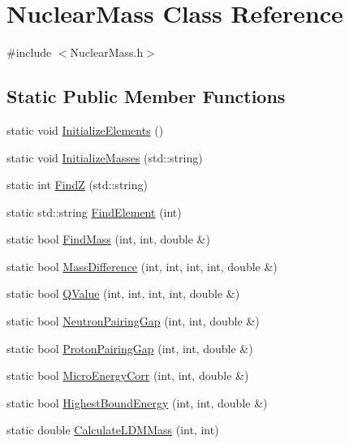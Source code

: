 \hypertarget{classNuclearMass}{\section{Nuclear\-Mass Class Reference}
\label{classNuclearMass}
}


{\ttfamily \#include $<$Nuclear\-Mass.\-h$>$}

\subsection*{Static Public Member Functions}
\begin{DoxyCompactItemize}
\item 
static void \hyperlink{classNuclearMass_a7225a76222f0dd2e466092ef1e5f40dd}{Initialize\-Elements} ()
\item 
static void \hyperlink{classNuclearMass_a76145d2def7d6cd40b9524ab9518eff3}{Initialize\-Masses} (std\-::string)
\item 
static int \hyperlink{classNuclearMass_ae5b0875835707ce2567529cf88fe33b1}{Find\-Z} (std\-::string)
\item 
static std\-::string \hyperlink{classNuclearMass_aaffdbd2dabf1b1216763c32cf0a22a72}{Find\-Element} (int)
\item 
static bool \hyperlink{classNuclearMass_a3bf04f82484549832925bf4f2441466d}{Find\-Mass} (int, int, double \&)
\item 
static bool \hyperlink{classNuclearMass_a851078a4e77d62f2f272e84bff5a4ee5}{Mass\-Difference} (int, int, int, int, double \&)
\item 
static bool \hyperlink{classNuclearMass_a6086c9b206e6a63c9895f7cdd954d5e8}{Q\-Value} (int, int, int, int, double \&)
\item 
static bool \hyperlink{classNuclearMass_acea701823ae741db56e908cf0910d3f1}{Neutron\-Pairing\-Gap} (int, int, double \&)
\item 
static bool \hyperlink{classNuclearMass_ab85a213db514601c61cf1f00a307e3ea}{Proton\-Pairing\-Gap} (int, int, double \&)
\item 
static bool \hyperlink{classNuclearMass_a6d1e15e3b55000fee7dcd9d12a983793}{Micro\-Energy\-Corr} (int, int, double \&)
\item 
static bool \hyperlink{classNuclearMass_acac25b099886be862e5e5bf40a6f16ef}{Highest\-Bound\-Energy} (int, int, double \&)
\item 
static double \hyperlink{classNuclearMass_a1e07c46a9d3b0f4338b23e8c0f7db99b}{Calculate\-L\-D\-M\-Mass} (int, int)
\end{DoxyCompactItemize}


